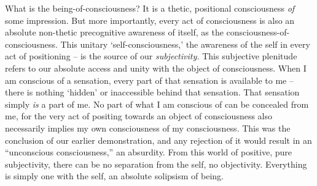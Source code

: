 

What is the being-of-consciousness? It is a thetic, positional consciousness \emph{of} some impression. But more importantly, every act of consciousness is also an absolute non-thetic precognitive awareness of itself, as the consciousness-of-consciousness. This unitary \enquote*{self-consciousness,} the awareness of the self in every act of positioning -- is the source of our \emph{subjectivity.}  This subjective plenitude refers to our absolute access and unity with the object of consciousness. When I am conscious of a sensation, every part of that sensation is available to me -- there is nothing \enquote*{hidden} or inaccessible behind that sensation.
That sensation simply \emph{is} a part of me. No part of what I am conscious of can be concealed from me, for the very act of positing towards an object of consciousness also necessarily implies my own consciousness of my consciousness. This was the conclusion of our earlier demonstration, and any rejection of it would result in an \enquote{unconscious consciousness,} an absurdity. From this world of positive, pure subjectivity, there can be no separation from the self, no objectivity. Everything is simply one with the self, an absolute solipsism of being.

